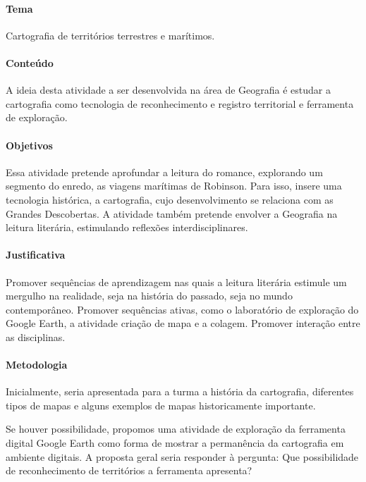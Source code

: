 \documentclass[12pt]{extarticle}
\begin{document}
\paragraph{Tema} Cartografia de territórios terrestres e marítimos.


\paragraph{Conteúdo}
A ideia desta atividade a ser desenvolvida na área de Geografia é
estudar a cartografia como tecnologia de reconhecimento e registro
territorial e ferramenta de exploração.

\paragraph{Objetivos}

Essa atividade pretende aprofundar a leitura do romance, explorando um
segmento do enredo, as viagens marítimas de Robinson. Para isso, insere
uma tecnologia histórica, a cartografia, cujo desenvolvimento se
relaciona com as Grandes Descobertas. A atividade também pretende
envolver a Geografia na leitura literária, estimulando reflexões
interdisciplinares.

\paragraph{Justificativa}
Promover sequências de aprendizagem nas quais a leitura literária
estimule um mergulho na realidade, seja na história do passado, seja no
mundo contemporâneo. Promover sequências ativas, como o laboratório de
exploração do Google Earth, a atividade criação de mapa e a colagem.
Promover interação entre as disciplinas.

\paragraph{Metodologia}
Inicialmente, seria apresentada para a turma a história da cartografia,
diferentes tipos de mapas e alguns exemplos de mapas historicamente
importante.

Se houver possibilidade, propomos uma atividade de exploração da
ferramenta digital Google Earth como forma de mostrar a permanência da
cartografia em ambiente digitais. A proposta geral seria responder à
pergunta: Que possibilidade de reconhecimento de territórios a
ferramenta apresenta?
\end{document}
